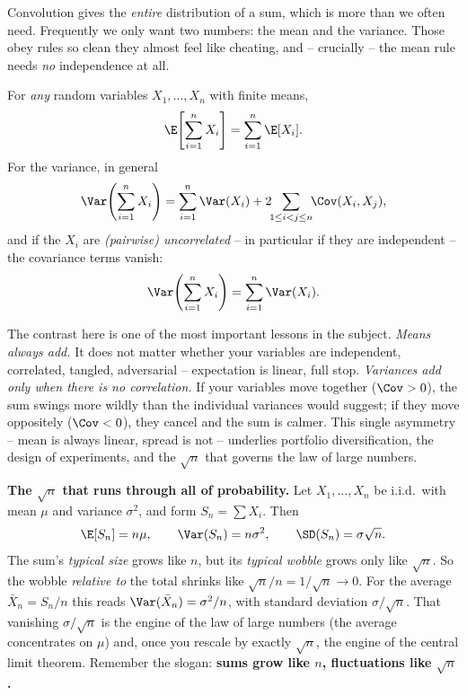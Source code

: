 Convolution gives the \emph{entire} distribution of a sum, which is more
than we often need. Frequently we only want two numbers: the mean and the
variance. Those obey rules so clean they almost feel like cheating, and --
crucially -- the mean rule needs \emph{no} independence at all.

\begin{theorem}
\label{ch17:thm-mean-var}
For \emph{any} random variables $X_1,\dots,X_n$ with finite means,
\[
\E\!\left[\sum_{i=1}^n X_i\right] = \sum_{i=1}^n \E[X_i].
\]
For the variance, in general
\[
\Var\!\left(\sum_{i=1}^n X_i\right)
  = \sum_{i=1}^n \Var(X_i) + 2\!\!\sum_{1\le i<j\le n}\!\! \Cov(X_i,X_j),
\]
and if the $X_i$ are \emph{(pairwise) uncorrelated} -- in particular if
they are independent -- the covariance terms vanish:
\[
\Var\!\left(\sum_{i=1}^n X_i\right) = \sum_{i=1}^n \Var(X_i).
\]
\end{theorem}

\begin{happeningbox}
The contrast here is one of the most important lessons in the subject.
\emph{Means always add.} It does not matter whether your variables are
independent, correlated, tangled, adversarial -- expectation is linear,
full stop. \emph{Variances add only when there is no correlation.} If your
variables move together ($\Cov>0$), the sum swings more wildly than the
individual variances would suggest; if they move oppositely ($\Cov<0$),
they cancel and the sum is calmer. This single asymmetry -- mean is always
linear, spread is not -- underlies portfolio diversification, the design
of experiments, and the $\sqrt{n}$ that governs the law of large numbers.
\end{happeningbox}

\begin{focusbox}
\textbf{The $\sqrt{n}$ that runs through all of probability.}
Let $X_1,\dots,X_n$ be i.i.d.\ with mean $\mu$ and variance $\sigma^2$,
and form $S_n=\sum X_i$. Then
\[
\E[S_n]=n\mu, \qquad \Var(S_n)=n\sigma^2, \qquad \SD(S_n)=\sigma\sqrt{n}.
\]
The sum's \emph{typical size} grows like $n$, but its \emph{typical
wobble} grows only like $\sqrt n$. So the wobble \emph{relative to} the
total shrinks like $\sqrt n / n = 1/\sqrt n \to 0$. For the average
$\bar X_n=S_n/n$ this reads $\Var(\bar X_n)=\sigma^2/n$, with standard
deviation $\sigma/\sqrt n$. That vanishing $\sigma/\sqrt n$ is the engine
of the law of large numbers (the average concentrates on $\mu$) and, once
you rescale by exactly $\sqrt n$, the engine of the central limit theorem.
Remember the slogan: \textbf{sums grow like $n$, fluctuations like
$\sqrt n$.}
\end{focusbox}

